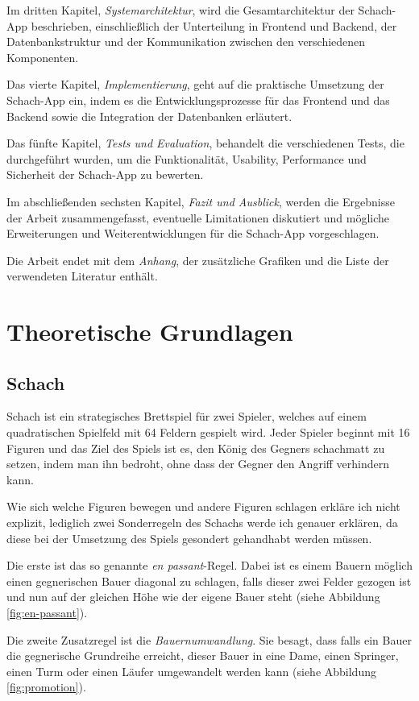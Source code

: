 \documentclass[a4paper,12pt]{report}
\begin{document}
Im dritten Kapitel, \textit{Systemarchitektur}, wird die Gesamtarchitektur der Schach-App beschrieben, einschließlich der Unterteilung in Frontend und Backend, der Datenbankstruktur und der Kommunikation zwischen den verschiedenen Komponenten.

Das vierte Kapitel, \textit{Implementierung}, geht auf die praktische Umsetzung der Schach-App ein, indem es die Entwicklungsprozesse für das Frontend und das Backend sowie die Integration der Datenbanken erläutert.

Das fünfte Kapitel, \textit{Tests und Evaluation}, behandelt die verschiedenen Tests, die durchgeführt wurden, um die Funktionalität, Usability, Performance und Sicherheit der Schach-App zu bewerten.

Im abschließenden sechsten Kapitel, \textit{Fazit und Ausblick}, werden die Ergebnisse der Arbeit zusammengefasst, eventuelle Limitationen diskutiert und mögliche Erweiterungen und Weiterentwicklungen für die Schach-App vorgeschlagen.

Die Arbeit endet mit dem \textit{Anhang}, der zusätzliche Grafiken und die Liste der verwendeten Literatur enthält.
\chapter{Theoretische Grundlagen}
    \section{Schach}
   Schach ist ein strategisches Brettspiel für zwei Spieler, welches auf einem quadratischen Spielfeld mit 64 Feldern gespielt wird. Jeder Spieler beginnt mit 16 Figuren und das Ziel des Spiels ist es, den König des Gegners schachmatt zu setzen, indem man ihn bedroht, ohne dass der Gegner den Angriff verhindern kann. 
   
   Wie sich welche Figuren bewegen und andere Figuren schlagen erkläre ich nicht explizit, lediglich zwei Sonderregeln des Schachs werde ich genauer erklären, da diese bei der Umsetzung des Spiels gesondert gehandhabt werden müssen.
   
   Die erste ist das so genannte \textit{en passant}-Regel. Dabei ist es einem Bauern möglich einen gegnerischen Bauer diagonal zu schlagen, falls dieser zwei Felder gezogen ist und nun auf der gleichen Höhe wie der eigene Bauer steht (siehe Abbildung \ref{fig:en-passant}).
   
   Die zweite Zusatzregel ist die \textit{Bauernumwandlung}. Sie besagt, dass falls ein Bauer die gegnerische Grundreihe erreicht, dieser Bauer in eine Dame, einen Springer, einen Turm oder einen Läufer umgewandelt werden kann (siehe Abbildung \ref{fig:promotion}).
   
\end{document}
